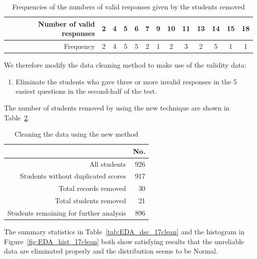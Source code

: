 \documentclass[a4paper]{report}
\begin{document}
\begin{table}[ht]
  \centering
  \begin{tabular}{rcccccccccccc}
    \hline
  Number of valid responses & 2 & 4 & 5 & 6 & 7 & 9 & 10 & 11 & 13 & 14 & 15 & 18 \\
  \hline 
    Frequency & 2 & 4 & 5 & 5 & 2 & 1 & 2 & 3 & 2 & 5 & 1 & 1 \\ 
     \hline
  \end{tabular}
  \caption{\label{tab:EDA_validresp_legacy}Frequencies of the numbers of valid responses given by the students removed}
\end{table}

We therefore modify the data cleaning method to make use of the validity data: 

\begin{enumerate}[\indent2*.]
\item Eliminate the students who gave three or more invalid responses in the 5 easiest questions in the second-half of the test. 
\end{enumerate}

The number of students removed by using the new technique are shown in Table~\ref{tab:EDA_count_clean}. 

\begin{table}[ht]
  \centering
  \begin{tabular}{rr}
    \hline
   & No. \\ 
    \hline
  All students & 926 \\ 
    Students without duplicated scores & 917 \\ 
    Total records removed &  30 \\ 
    Total students removed &  21 \\ 
    Students remaining for further analysis & 896 \\ 
     \hline
  \end{tabular}
  \caption{\label{tab:EDA_count_clean}Cleaning the data using the new method}
\end{table}

The summary statistics in Table~\ref{tab:EDA_dsc_17clean} and the histogram in Figure~\ref{fig:EDA_hist_17clean} both show satisfying results that the unreliable data are eliminated properly and the distribution seems to be Normal. 
\end{document}
